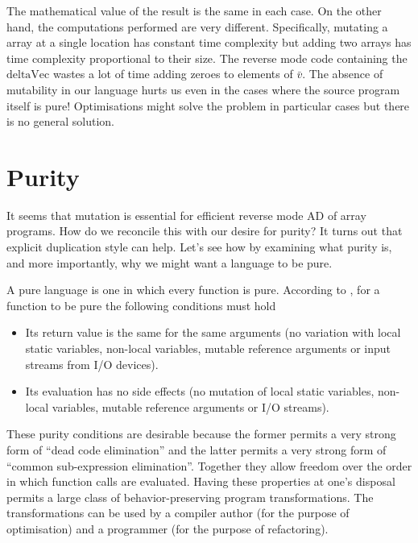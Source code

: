 \documentclass[12pt]{article}
\begin{document}
The mathematical value of the result is the same in each case.  On the
other hand, the computations performed are very different.
Specifically, mutating a array at a single location has constant time
complexity but adding two arrays has time complexity proportional to
their size.  The reverse mode code containing the $\textrm{deltaVec}$
wastes a lot of time adding zeroes to elements of $\bar{v}$.  The
absence of mutability in our language hurts us even in the cases where
the source program itself is pure!  Optimisations might solve the
problem in particular cases but there is no general solution.


\section{Purity}

It seems that mutation is essential for efficient reverse mode AD of
array programs.  How do we reconcile this with our desire for purity?
It turns out that explicit duplication style can help.  Let's see how
by examining what purity is, and more importantly, why we might want a
language to be pure.

A pure language is one in which every function is pure.  According to
\cite{purity}, for a function to be pure the following conditions must
hold

\begin{itemize}
  \item
    Its return value is the same for the same arguments (no variation
    with local static variables, non-local variables, mutable
    reference arguments or input streams from I/O devices).

  \item
    Its evaluation has no side effects (no mutation of local
    static variables, non-local variables, mutable reference
    arguments or I/O streams).
\end{itemize}

These purity conditions are desirable because the former permits a
very strong form of ``dead code elimination'' and the latter permits a
very strong form of ``common sub-expression elimination''.  Together
they allow freedom over the order in which function calls are
evaluated.  Having these properties at one's disposal permits a large
class of behavior-preserving program transformations.  The
transformations can be used by a compiler author (for the purpose of
optimisation) and a programmer (for the purpose of refactoring).
\end{document}
